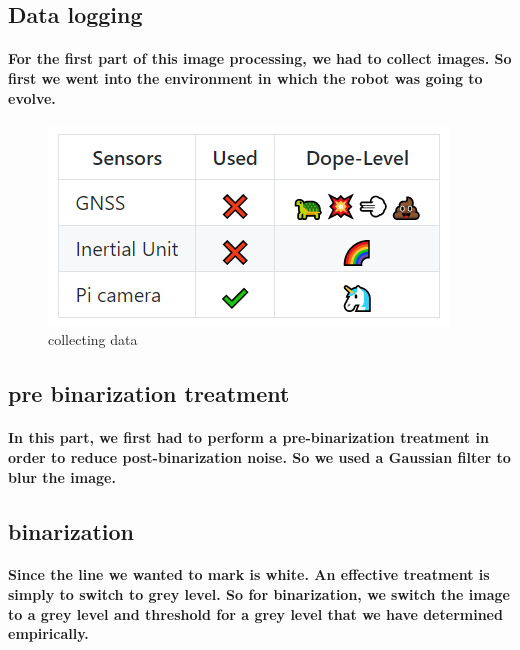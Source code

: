 
\subsection{Data logging}

\paragraph{For the first part of this image processing, we had to collect images.
So first we went into the environment in which the robot was going to evolve.}

\begin{figure}[h!]
    \begin{center}
        \includegraphics[scale=0.3]{Images/Sensors.png}
    \end{center}
    \caption{collecting data}
    \label{fig:capture}
\end{figure}

\subsection{pre binarization treatment}
\paragraph{In this part, we first had to perform a pre-binarization treatment in order to reduce post-binarization noise.
So we used a Gaussian filter to blur the image. }

\subsection{binarization}
\paragraph{Since the line we wanted to mark is white. An effective treatment is simply to switch to grey level. 
So for binarization, we switch the image to a grey level and threshold for a grey level that we have determined empirically. }

